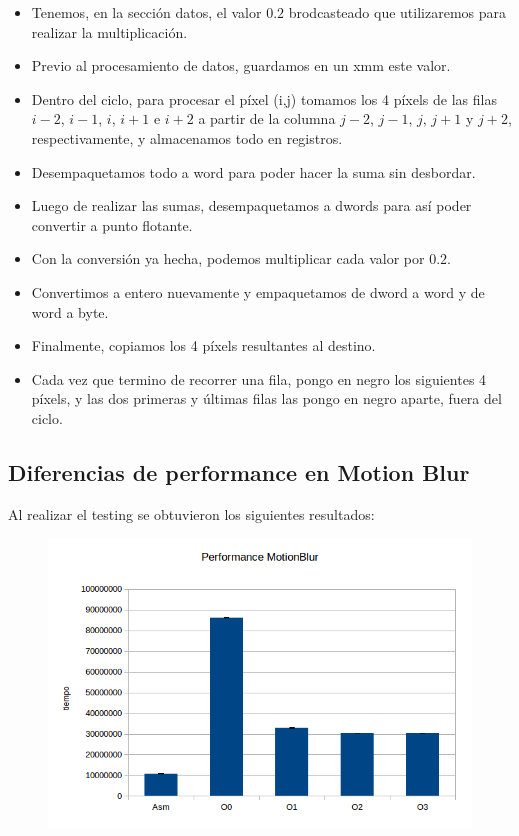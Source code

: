 \documentclass[a4paper]{article}
\begin{document}
\begin{itemize}
\item  Tenemos, en la sección datos, el valor $0.2$ brodcasteado que utilizaremos para realizar la multiplicación.
\item  Previo al procesamiento de datos, guardamos en un xmm este valor.
\item  Dentro del ciclo, para procesar el píxel (i,j) tomamos los 4 píxels de las filas $i-2$, $i-1$, $i$, $i+1$ e $i+2$ a partir de la columna $j-2$, $j-1$, $j$, $j+1$ y $j+2$, respectivamente, y almacenamos todo en registros.
\item  Desempaquetamos todo a word para poder hacer la suma sin desbordar.
\item  Luego de realizar las sumas, desempaquetamos a dwords para así poder convertir a punto flotante.
\item  Con la conversión ya hecha, podemos multiplicar cada valor por $0.2$.
\item  Convertimos a entero nuevamente y empaquetamos de dword a word y de word a byte.
\item  Finalmente, copiamos los 4 píxels resultantes al destino. 
\item  Cada vez que termino de recorrer una fila, pongo en negro los siguientes 4 píxels, y las dos primeras y últimas filas las pongo en negro aparte, fuera del ciclo.
\end{itemize}

\subsection{Diferencias de performance en Motion Blur}

Al realizar el testing se obtuvieron los siguientes resultados:

\newpage

\begin{figure}[h!]
  \begin{center}
  \includegraphics[scale=0.66]{Graficos1.4/mbl/per.jpg}
  \label{nombreparareferenciar11}
  \end{center}
\end{figure}
\end{document}
